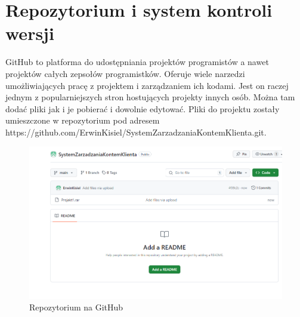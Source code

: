 \chapter{Repozytorium i system kontroli wersji}

GitHub to platforma do udostępniania projektów programistów a nawet projektów całych zepsołów programistków. Oferuje wiele narzedzi umożliwiających pracę z projektem i zarządzaniem ich kodami. Jest on raczej jednym z popularniejszych stron hostujących projekty innych osób. Można tam dodać pliki jak i je pobierać i dowolnie edytować. Pliki do projektu zostały umieszczone w repozytorium pod adresem https://github.com/ErwinKisiel/SystemZarzadzaniaKontemKlienta.git.

\begin{figure}[h]
    \centering
    \includegraphics[width=\textwidth]{Repozytorium.png}
      \caption{Repozytorium na GitHub}
    \label{fig:example}
\end{figure}
